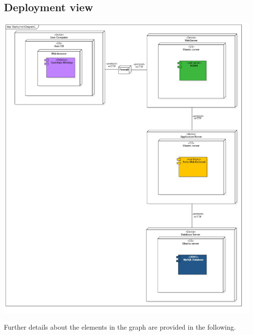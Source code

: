 \documentclass{article}
\begin{document}
\subsection{Deployment view}
\begin{center}
    \includegraphics[width=0.9\linewidth]{dv.jpg}
  \label{fig:dv}
\end{center}
Further details about the elements in the graph are provided in the following.
\end{document}
